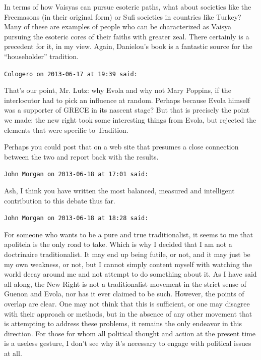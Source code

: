 \begin{footnotesize}
\begin{sffamily}
In terms of how Vaisyas can pursue esoteric paths, what about societies like the Freemasons (in their original form) or Sufi societies in countries like Turkey? Many of these are examples of people who can be characterized as Vaisya pursuing the esoteric cores of their faiths with greater zeal. There certainly is a precedent for it, in my view. Again, Danielou's book is a fantastic source for the ``householder'' tradition.

\hfill

\texttt{Cologero on 2013-06-17 at 19:39 said:}

That's our point, Mr. Lutz: why Evola and why not Mary Poppins, if the interlocutor had to pick an influence at random. Perhaps because Evola himself was a supporter of GRECE in its nascent stage? But that is precisely the point we made: the new right took some interesting things from Evola, but rejected the elements that were specific to Tradition.

Perhaps you could post that on a web site that presumes a close connection between the two and report back with the results.

\hfill

\texttt{John Morgan on 2013-06-18 at 17:01 said:}

Ash, I think you have written the most balanced, measured and intelligent contribution to this debate thus far.

\hfill

\texttt{John Morgan on 2013-06-18 at 18:28 said:}

For someone who wants to be a pure and true traditionalist, it seems to me that apoliteia is the only road to take. Which is why I decided that I am not a doctrinaire traditionalist. It may end up being futile, or not, and it may just be my own weakness, or not, but I cannot simply content myself with watching the world decay around me and not attempt to do something about it. As I have said all along, the New Right is not a traditionalist movement in the strict sense of Guenon and Evola, nor has it ever claimed to be such. However, the points of overlap are clear. One may not think that this is sufficient, or one may disagree with their approach or methods, but in the absence of any other movement that is attempting to address these problems, it remains the only endeavor in this direction. For those for whom all political thought and action at the present time is a useless gesture, I don't see why it's necessary to engage with political issues at all.


\end{sffamily}
\end{footnotesize}
